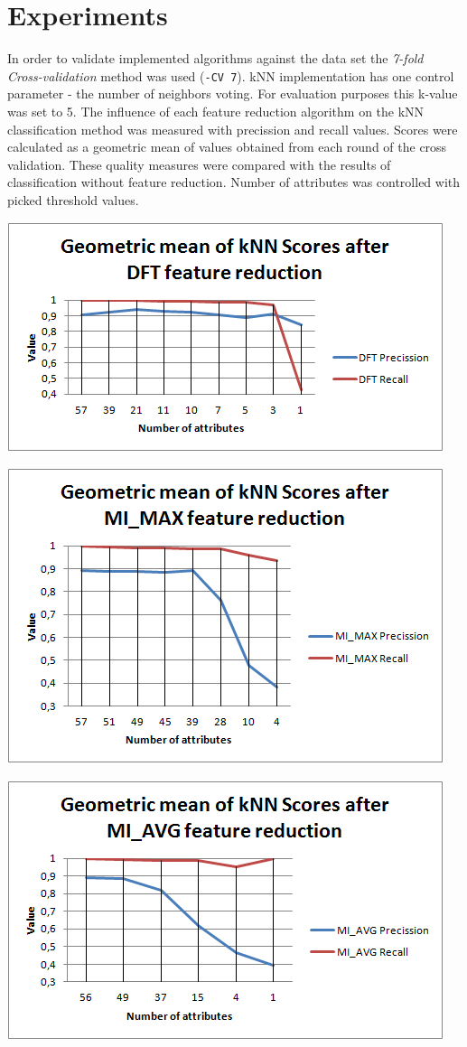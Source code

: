 \documentclass[12pt,a4paper]{report}
\begin{document}
\chapter{Experiments}

In order to validate implemented algorithms against the data set the \emph{7-fold Cross-validation} method was used (\texttt{-CV 7}). kNN implementation has one control parameter - the number of neighbors voting. For evaluation purposes this k-value was set to 5.
The influence of each feature reduction algorithm on the kNN classification method was measured with precission and recall values. Scores were calculated as a geometric mean of values obtained from each round of the cross validation.  These quality measures were compared with the results of classification without feature reduction. Number of attributes was controlled with picked threshold values.

\includegraphics[scale=1]{DFTscores}

\includegraphics[scale=1]{MIMAXscores}

\includegraphics[scale=1]{MIAVGscores}
\end{document}

